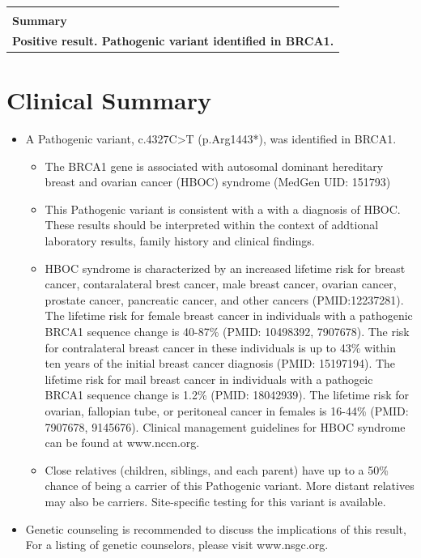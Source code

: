\documentclass[9pt,a4paper]{article}
\begin{document}
\par\null\par

\begin{center}
\begin{longtable}{p{17cm}}
\rowcolor{gray!30}  \\ \rowcolor{gray!30} \textbf{Summary} \\[10pt] 
\rowcolor{gray!30} \Large{\textbf{Positive result. Pathogenic variant identified in BRCA1.}} \par
\end{longtable}
\end{center}

\section*{{\color{invitae}Clinical Summary \leaders\vrule height 2.5pt depth -1.5pt \hfill \null}}


\begin{itemize}[leftmargin=0.4cm]
	\item A Pathogenic variant, c.4327C>T (p.Arg1443*), was identified in BRCA1. 
	\begin{itemize}
	  \item The BRCA1 gene is associated with autosomal dominant hereditary breast and ovarian cancer (HBOC) syndrome (MedGen UID: 151793)
	  \item This Pathogenic variant is consistent with a with a diagnosis of HBOC. These results should be interpreted within the context of addtional laboratory results, family history and clinical findings.
	  \item HBOC syndrome is characterized by an increased lifetime risk for breast cancer, contaralateral brest cancer, male breast cancer, ovarian cancer, prostate cancer, pancreatic cancer, and other cancers (PMID:12237281). The lifetime risk for female breast cancer in individuals with a pathogenic BRCA1 sequence change is 40-87\% (PMID: 10498392, 7907678). The risk for contralateral breast cancer in these individuals is up to 43\% within ten years of the initial breast cancer diagnosis (PMID: 15197194). The lifetime risk for mail breast cancer in individuals with a pathogeic BRCA1 sequence change is 1.2\% (PMID: 18042939). The lifetime risk for ovarian, fallopian tube, or peritoneal cancer in females is 16-44\% (PMID: 7907678, 9145676). Clinical management guidelines for HBOC syndrome can be found at www.nccn.org.
	  \item Close relatives (children, siblings, and each parent) have up to a 50\% chance of being a carrier of this Pathogenic variant. More distant relatives may also be carriers. Site-specific testing for this variant is available.
	\end{itemize}
	\item Genetic counseling is recommended to discuss the implications of this result, For a listing of genetic counselors, please visit www.nsgc.org.
\end{itemize}
\end{document}
